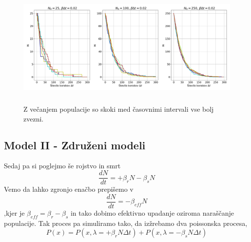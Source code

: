 \documentclass[11pt, a4paper]{article}
\begin{document}
 \begin{figure}[H]
\centering

  \includegraphics[width=18cm, height=6cm]{Umiranje_1b.png}
   \caption{Z večanjem populacije so skoki med časovnimi intervali vse bolj zvezni.}
  
 \end{figure}

 \subsection{Model II - Združeni modeli}
Sedaj pa si poglejmo še rojstvo in smrt
\begin{equation}
\frac{dN}{dt} = + \beta_r N - \beta_s N
\end{equation}
Vemo da lahko zgronjo enačbo prepišemo v 
\begin{equation}
\frac{dN}{dt} = - \beta_{eff} N
\end{equation}
,kjer je $\beta_{eff} = \beta_r - \beta_s$ in tako dobimo efektivno upadanje oziroma naraščanje populacije. Tak proces pa simuliramo tako, da izžrebamo dva poissonska procesa, 
\begin{equation}
P (x) =  P( x, \lambda = + \beta_r N \Delta t) + P (x , \lambda = - \beta_s N \Delta t)
\end{equation}
\end{document}
